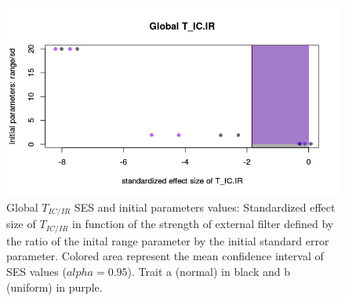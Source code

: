 \documentclass[12pt]{article}\usepackage[]{graphicx}\usepackage[]{color}
\makeatletter
\def\maxwidth{ %
  \ifdim\Gin@nat@width>\linewidth
    \linewidth
  \else
    \Gin@nat@width
  \fi
}
\newenvironment{knitrout}{}{} %
\makeatother
\begin{document}
\begin{knitrout}
\begin{figure}
{\centering \includegraphics[width=\maxwidth]{figure/External_filter_Results_plots_initial_param1-1} 

}

\caption[Global $T_{IC/IR}$ SES and initial parameters values]{Global $T_{IC/IR}$ SES and initial parameters values: Standardized effect size of $T_{IC/IR}$ in function of the strength of external filter defined by the ratio of the inital range parameter by the initial standard error parameter. Colored area represent the mean confidence interval of SES values ($alpha = 0.95$). Trait a (normal) in black and b (uniform) in purple.}\label{fig:External_filter_Results_plots_initial_param1}
\end{figure}


\end{knitrout}
\end{document}

